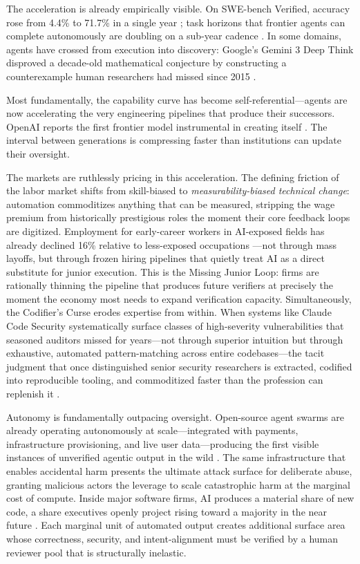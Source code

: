 \documentclass[12pt, letter]{article}
\begin{document}
The acceleration is already empirically visible. On SWE-bench Verified, accuracy rose from 4.4\% to 71.7\% in a single year \citep{stanfordaiindex2025}; task horizons that frontier agents can complete autonomously are doubling on a sub-year cadence \citep{metr2025longtasks, metr2026update}. In some domains, agents have crossed from execution into discovery: Google's Gemini 3 Deep Think disproved a decade-old mathematical conjecture by constructing a counterexample human researchers had missed since 2015 \citep{deepmind2026deepthink}.

Most fundamentally, the capability curve has become self-referential---agents are now accelerating the very engineering pipelines that produce their successors. OpenAI reports the first frontier model instrumental in creating itself \citep{openai2026gpt53codex}. The interval between generations is compressing faster than institutions can update their oversight.

The markets are ruthlessly pricing in this acceleration. The defining friction of the labor market shifts from skill-biased to \emph{measurability-biased technical change}: automation commoditizes anything that can be measured, stripping the wage premium from historically prestigious roles the moment their core feedback loops are digitized. Employment for early-career workers in AI-exposed fields has already declined 16\% relative to less-exposed occupations \citep{Brynjolfsson2025}---not through mass layoffs, but through frozen hiring pipelines that quietly treat AI as a direct substitute for junior execution. This is the Missing Junior Loop: firms are rationally thinning the pipeline that produces future verifiers at precisely the moment the economy most needs to expand verification capacity. Simultaneously, the Codifier's Curse erodes expertise from within. When systems like Claude Code Security systematically surface classes of high-severity vulnerabilities that seasoned auditors missed for years---not through superior intuition but through exhaustive, automated pattern-matching across entire codebases---the tacit judgment that once distinguished senior security researchers is extracted, codified into reproducible tooling, and commoditized faster than the profession can replenish it \citep{anthropic2026security}.

Autonomy is fundamentally outpacing oversight. Open-source agent swarms are already operating autonomously at scale---integrated with payments, infrastructure provisioning, and live user data---producing the first visible instances of unverified agentic output in the wild \citep{openclaw2026}. The same infrastructure that enables accidental harm presents the ultimate attack surface for deliberate abuse, granting malicious actors the leverage to scale catastrophic harm at the marginal cost of compute. Inside major software firms, AI produces a material share of new code, a share executives openly project rising toward a majority in the near future \citep{nadella2025build, pichai2025earnings, zuckerberg2025llamacon, amodei2025cfr}. Each marginal unit of automated output creates additional surface area whose correctness, security, and intent-alignment must be verified by a human reviewer pool that is structurally inelastic.
\end{document}

